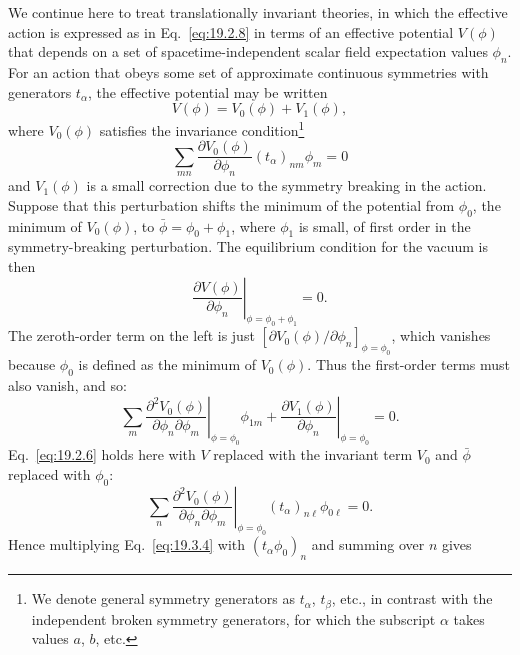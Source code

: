 We continue here to treat translationally invariant theories, in which the effective action is expressed as in Eq.~\eqref{eq:19.2.8} in terms of an effective potential $V(\phi)$ that depends on a set of spacetime-independent scalar field expectation values $\phi_n$. For an action that obeys some set of approximate continuous symmetries with generators $t_\alpha$, the effective potential may be written
\begin{equation}
V(\phi)=V_0(\phi)+V_1(\phi),
\tag{19.3.1}\label{eq:19.3.1}
\end{equation}
where $V_0(\phi)$ satisfies the invariance condition\footnote{We denote general symmetry generators as $t_\alpha$, $t_\beta$, etc., in contrast with the independent broken symmetry generators, for which the subscript $\alpha$ takes values $a$, $b$, etc.}
\begin{equation}
\sum_{mn}\frac{\partial V_0(\phi)}{\partial\phi_n}(t_\alpha)_{nm}\phi_m=0
\tag{19.3.2}\label{eq:19.3.2}
\end{equation}
and $V_1(\phi)$ is a small correction due to the symmetry breaking in the action. Suppose that this perturbation shifts the minimum of the potential from $\phi_0$, the minimum of $V_0(\phi)$, to $\bar\phi=\phi_0+\phi_1$, where $\phi_1$ is small, of first order in the symmetry-breaking perturbation. The equilibrium condition for the vacuum is then
\begin{equation}
\left.\frac{\partial V(\phi)}{\partial\phi_n}\right|_{\phi=\phi_0+\phi_1}=0.
\tag{19.3.3}\label{eq:19.3.3}
\end{equation}
The zeroth-order term on the left is just
$[\partial V_0(\phi)/\partial\phi_n]_{\phi=\phi_0}$, which vanishes because $\phi_0$ is defined as the minimum of $V_0(\phi)$. Thus the first-order terms must also vanish, and so:
\begin{equation}
\left.\sum_m\frac{\partial^2 V_0(\phi)}
{\partial\phi_n\partial\phi_m}\right|_{\phi=\phi_0}\phi_{1m}
+\left.\frac{\partial V_1(\phi)}{\partial\phi_n}\right|_{\phi=\phi_0}=0.
\tag{19.3.4}\label{eq:19.3.4}
\end{equation}
Eq.~\eqref{eq:19.2.6} holds here with $V$ replaced with the invariant term $V_0$ and $\bar\phi$ replaced with $\phi_0$:
\begin{equation}
\left.\sum_n\frac{\partial^2 V_0(\phi)}
{\partial\phi_n\partial\phi_m}\right|_{\phi=\phi_0}
(t_\alpha)_{n\ell}\phi_{0\ell}=0.
\tag{19.3.5}\label{eq:19.3.5}
\end{equation}
Hence multiplying Eq.~\eqref{eq:19.3.4} with $(t_\alpha\phi_0)_n$ and summing over $n$ gives

